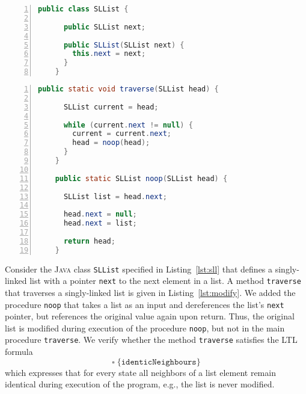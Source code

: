 \documentclass[a4paper, 12pt, twoside]{report}
\begin{document}
	\begin{lstlisting}[language=Java,numbers=left,
	stepnumber=1,autogobble=true,keywordstyle=\color{blue},frame=single,caption={\textsc{Java} class definition for singly-linked lists.},captionpos=b,label={lst:sll}]
	public class SLList {
		
	  public SLList next;
	  	  	
	  public SLList(SLList next) {	  	
	    this.next = next;
	  }
	}
	\end{lstlisting}	
	
	\begin{lstlisting}[language=Java,numbers=left,
	stepnumber=1,autogobble=true,keywordstyle=\color{blue},frame=single,caption={\textsc{Java} code for traversing a singly-linked list that contains erroneous behaviour in a called procedure.},captionpos=b,label={lst:modify}]	  
	public static void traverse(SLList head) {	
	
	  SLList current = head;	
	  
	  while (current.next != null) {
	    current = current.next;
	    head = noop(head);
	  }
	}
	
	public static SLList noop(SLList head) {
		
	  SLList list = head.next;
	  
	  head.next = null;
	  head.next = list;
	  
	  return head;
	}	
	\end{lstlisting}	
	
	Consider the \textsc{Java} class \texttt{SLList} specified in Listing~\ref{lst:sll} that defines a singly-linked list with a pointer \texttt{next} to the next element in a list. A method \texttt{traverse} that traverses a singly-linked list is given in Listing~\ref{lst:modify}. We added the procedure \texttt{noop} that takes a list as an input and dereferences the list's \texttt{next} pointer, but references the original value again upon return. Thus, the original list is modified during execution of the procedure \texttt{noop}, but not in the main procedure \texttt{traverse}. We verify whether the method \texttt{traverse} satisfies the LTL formula \[\square\;\{\texttt{identicNeighbours}\}\] which expresses that for every state all neighbors of a list element remain identical during execution of the program, e.g., the list is never modified.\\
	
\end{document}

